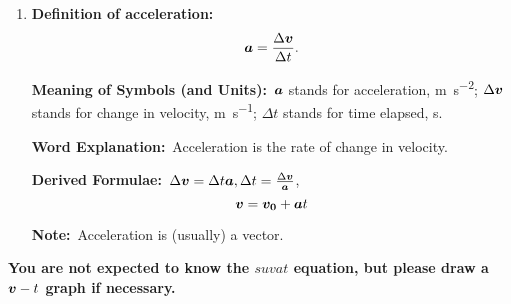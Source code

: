 \documentclass[8pt]{article}
\newcommand{\MeanSymb}{\textbf{Meaning of Symbols (and Units):}\ }
\newcommand{\WordExpl}{\textbf{Word Explanation:}\ }
\newcommand{\DeriForm}{\textbf{Derived Formulae:}\ }
\newcommand{\Note}{\textbf{Note:}\ }
\begin{document}
\begin{enumerate}
                \item \textbf{Definition of acceleration:}
                \[
                    \boldsymbol{a} = \frac{\Delta \boldsymbol{v}}{\Delta t}.
                \]

                \MeanSymb \(\boldsymbol{a}\) stands for acceleration, \unit{\metre\per\second\squared}; \(\Delta \boldsymbol{v}\) stands for change in velocity, \unit{\metre\per\second}; \(\Delta t\) stands for time elapsed, \unit{\second}.

                \WordExpl Acceleration is the rate of change in velocity.

                \DeriForm \(\Delta \boldsymbol{v} = \Delta t \boldsymbol{a}, \Delta t = \frac{\Delta \boldsymbol{v}}{\boldsymbol{a}}\),
                \[
                    \boldsymbol{v} = \boldsymbol{v_0} + \boldsymbol{a}t
                \]

                \Note Acceleration is (usually) a vector.

            \end{enumerate}

            \textbf{You are not expected to know the \(suvat\) equation, but please draw a \(\boldsymbol{v}-t\) graph if necessary.}
\end{document}
